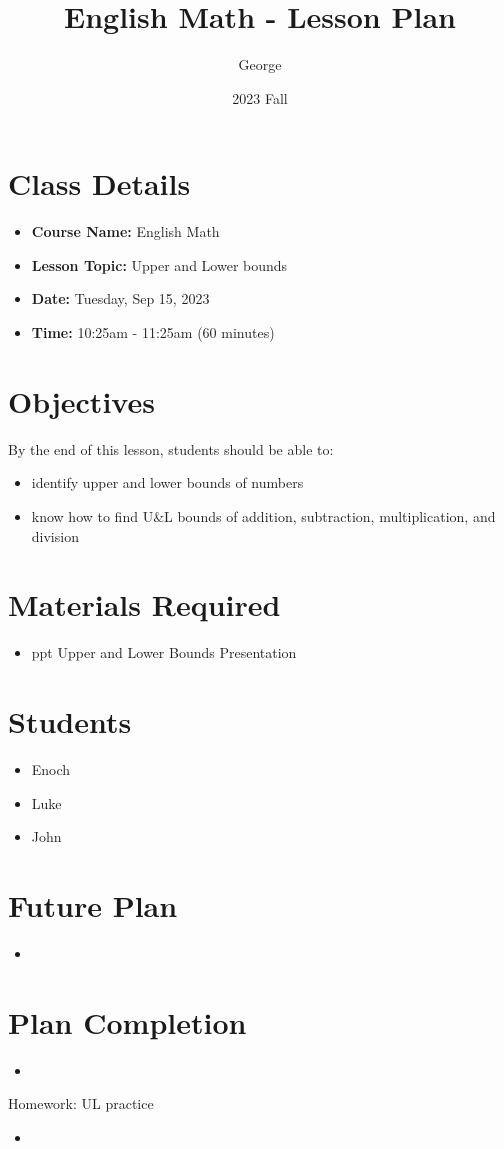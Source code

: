 \documentclass[12pt]{article}
\title{English Math - Lesson Plan}
\author{George}
\date{2023 Fall}
\begin{document}
\maketitle

\section{Class Details}
\begin{itemize}
    \item \textbf{Course Name:} English Math
    \item \textbf{Lesson Topic:}  Upper and Lower bounds
    \item \textbf{Date:} Tuesday, Sep 15, 2023
    \item \textbf{Time:} 10:25am - 11:25am (60 minutes)
\end{itemize}

\section{Objectives}
By the end of this lesson, students should be able to:
\begin{itemize}
    \item identify upper and lower bounds of numbers
    \item know how to find U&L bounds of addition, subtraction, multiplication, and division
   

\end{itemize}

\section{Materials Required}
\begin{itemize}
   
    \item ppt Upper and Lower Bounds Presentation

  
\end{itemize}


\section{Students}
\begin{itemize}
    \item Enoch
    \item Luke
    \item John

\end{itemize}


\section{Future Plan}
\begin{itemize}
    \item 

\end{itemize}
\section{Plan Completion}
\begin{itemize}
    \item 
\end{itemize}
Homework: UL practice
\begin{itemize}
    \item 
\end{itemize}
\end{document}
